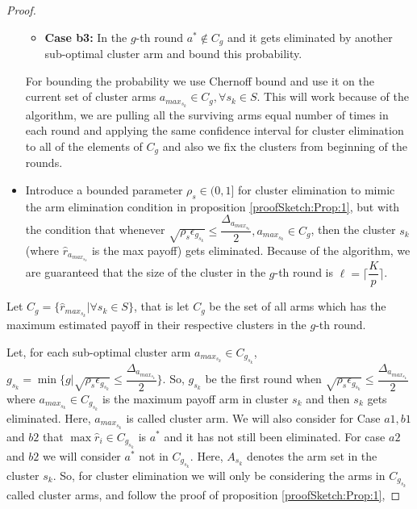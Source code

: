 \begin{proof}
\begin{itemize}
\begin{itemize}
\item \textbf{Case b3:} In the $g$-th round $a^{*}\notin C_{g}$ and it gets eliminated by another sub-optimal cluster arm  and bound this probability.
\end{itemize}
For bounding the probability we use Chernoff bound and use it on the current set of cluster arms $a_{max_{s_{k}}}\in C_{g},\forall s_{k}\in S$. This will work because of the algorithm, we are pulling all the  surviving arms equal number of times in each round and applying the same confidence interval for cluster elimination to all of the elements of $C_{g}$ and also we fix the clusters from beginning of the rounds.
\item Introduce a bounded parameter $\rho_{s}\in (0,1]$ for cluster elimination to mimic the arm elimination condition in proposition \ref{proofSketch:Prop:1}, but with the condition that whenever $\sqrt{\rho_{s}\epsilon_{g_{s_{k}}}}\leq \dfrac{\Delta_{a_{max_{s_{k}}}}}{2}, a_{max_{s_{k}}}\in C_{g}$, then the cluster $s_{k}$(where $\hat{r}_{a_{max_{s_{k}}}}$ is the max payoff) gets eliminated. Because of the algorithm, we are guaranteed that the size of the cluster in the $g$-th round is $\ell=\bigg\lceil \dfrac{K}{p}\bigg\rceil$.
\end{itemize}

Let $C_{g}=\lbrace \hat{r}_{max_{s_{k}}}| \forall s_{k}\in S \rbrace$, that is let $C_{g}$ be the set of all arms which has the maximum estimated payoff in their respective clusters in the $g$-th round.

Let, for each sub-optimal cluster arm $a_{max_{s_{k}}}\in C_{g_{s_{k}}}$, $g_{s_{k}}=\min{\lbrace g|\sqrt{\rho_{s}\epsilon_{g_{s_{k}}}}\leq \dfrac{\Delta_{a_{max_{s_{k}}}}}{2} \rbrace}$. So, $g_{s_{k}}$ be the first round when $\sqrt{\rho_{s}\epsilon_{g_{s_{k}}}}\leq \dfrac{\Delta_{a_{max_{s_{k}}}}}{2}$ where $a_{max_{s_{k}}}\in C_{g_{s_{k}}}$ is the maximum payoff arm in cluster $s_{k}$ and then $s_{k}$ gets eliminated. Here, $a_{max_{s_{k}}}$ is called cluster arm. We will also consider for Case $a1,b1 $ and $b2$  that $\max \hat{r}_{i}\in C_{g_{s_{k}}}$ is $a^{*}$ and it has not still been eliminated. For case $a2$ and $b2$ we will consider $a^{*}$ not in $C_{g_{s_{k}}}$. Here, $A_{{s_{k}}}$ denotes the arm set in the cluster $s_{k}$. So, for cluster elimination we will only be considering the arms in $C_{g_{s_{k}}}$ called cluster arms, and follow the proof of proposition \ref{proofSketch:Prop:1},


\end{proof}
